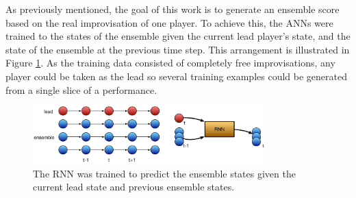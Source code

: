 \documentclass{article}
\begin{document}
As previously mentioned, the goal of this work is to generate an
ensemble score based on the real improvisation of one player. To
achieve this, the ANNs were trained to the states of the ensemble
given the current lead player's state, and the state of the ensemble
at the previous time step. This arrangement is illustrated in Figure
\ref{fig:nn-ensemble-training}. As the training data consisted of
completely free improvisations, any player could be taken as the lead
so several training examples could be generated from a single slice of
a performance.

\begin{figure}
  \centering
  \includegraphics[width=0.8\textwidth]{nn-ensemble-training}
  \caption{The RNN was trained to predict the ensemble states given
    the current lead state and previous ensemble
    states.}\label{fig:nn-ensemble-training}
\end{figure}


 

\end{document}
